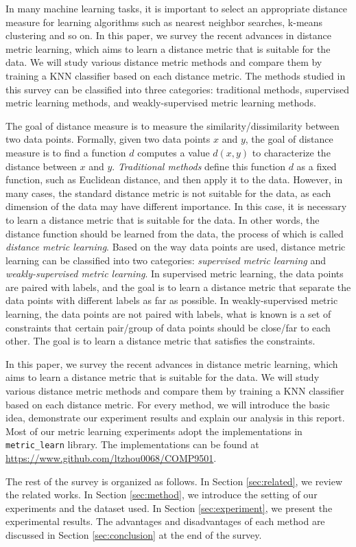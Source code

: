 


In many machine learning tasks, it is important to select an appropriate distance measure for learning algorithms such as nearest neighbor searches, k-means clustering and so on. 
In this paper, we survey the recent advances in distance metric learning, which aims to learn a distance metric that is suitable for the data. We will study various distance metric methods and compare them by training a KNN classifier based on each distance metric. The methods studied in this survey can be classified into three categories: traditional methods, supervised metric learning methods, and weakly-supervised metric learning methods. 

The goal of distance measure is to measure the similarity/dissimilarity between two data points. Formally, given two data points $x$ and $y$, the goal of distance measure is to find a function $d$ computes a value $d(x,y)$ to characterize the distance between $x$ and $y$. \emph{Traditional methods} define this function $d$ as a fixed function, such as Euclidean distance, and then apply it to the data. However, in many cases, the standard distance metric is not suitable for the data, as each dimension of the data may have different importance. In this case, it is necessary to learn a distance metric that is suitable for the data. In other words, the distance function should be learned from the data, the process of which is called \emph{distance metric learning}.
Based on the way data points are used, distance metric learning can be classified into two categories: \emph{supervised metric learning} and \emph{weakly-supervised metric learning}. In supervised metric learning, the data points are paired with labels, and the goal is to learn a distance metric that separate the data points with different labels as far as possible. In weakly-supervised metric learning, the data points are not paired with labels, what is known is a set of constraints that certain pair/group of data points should be close/far to each other. The goal is to learn a distance metric that satisfies the constraints.

In this paper, we survey the recent advances in distance metric learning, which aims to learn a distance metric that is suitable for the data. We will study various distance metric methods and compare them by training a KNN classifier based on each distance metric. For every method, we will introduce the basic idea, demonstrate our experiment results and explain our analysis in this report. Most of our metric learning experiments adopt the implementations in \texttt{metric\_learn}\cite{metric-learn} library. 
The implementations can be found at \url{https://www.github.com/ltzhou0068/COMP9501}.

The rest of the survey is organized as follows. In Section \ref{sec:related}, we review the related works. In Section \ref{sec:method}, we introduce the setting of our experiments and the dataset used. In Section \ref{sec:experiment}, we present the experimental results. 
The advantages and disadvantages of each method are discussed in Section \ref{sec:conclusion} at the end of the survey.





